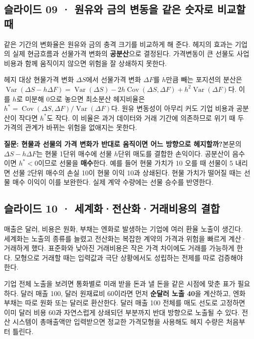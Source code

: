 \documentclass[11pt,a4paper]{article}
\begin{document}
\subsection{슬라이드 09 · 원유와 금의 변동을 같은 숫자로 비교할 때}
같은 기간의 변화율은 원유와 금의 충격 크기를 비교하게 해 준다. 헤지의 효과는 기업의 실제 현금흐름과 선물가격 변화의 \textbf{공분산}으로 결정된다. 가격변동이 큰 선물도 사업 비용과 함께 움직이지 않으면 위험을 잘 상쇄하지 못한다.\par

헤지 대상 현물가격 변화 $\Delta S$에서 선물가격 변화 $\Delta F$를 $h$만큼 빼는 포지션의 분산은 $\operatorname{Var}(\Delta S-h\Delta F)=\operatorname{Var}(\Delta S)-2h\operatorname{Cov}(\Delta S,\Delta F)+h^2\operatorname{Var}(\Delta F)$다. 이를 $h$로 미분해 0으로 놓으면 최소분산 헤지비율은 $h^*=\operatorname{Cov}(\Delta S,\Delta F)/\operatorname{Var}(\Delta F)$다. 원유 변동성이 아무리 커도 기업 비용과 공분산이 작다면 $h^*$도 작다. 이 비율은 과거 데이터와 거래 기간에 의존하므로 위기 때 두 가격의 관계가 바뀌는 위험을 없애지는 못한다.\par

\par\medskip\noindent\textbf{질문: 현물과 선물의 가격 변화가 반대로 움직이면 어느 방향으로 헤지할까?}\quad 본문의 $\Delta S-h\Delta F$는 현물 1단위 매수에 선물 $h$단위 매도를 결합한 손익이다. 공분산이 음수이면 $h^*<0$이므로 선물을 \textbf{매수}한다. 예를 들어 현물 가치가 10 오를 때 선물이 5 내리면 선물 2단위 매수의 손실 10이 현물 이익 10과 상쇄된다. 현물 가치가 떨어질 때는 선물 매수 이익이 이를 보완한다. 실제 계약 수량에는 선물 승수를 반영한다.\par

\subsection{슬라이드 10 · 세계화·전산화·거래비용의 결합}
매출은 달러, 비용은 원화, 부채는 엔화로 발생하는 기업에 여러 환율 노출이 생긴다. 세계화는 노출의 종류를 늘렸고 전산화는 복잡한 계약의 가격과 위험을 빠르게 계산·거래하게 했다. 표준화와 낮아진 거래비용은 작은 가격 차이에도 거래를 가능하게 한다. 모형으로 거래할 때는 입력값과 극단 상황에서도 성립하는 전제를 따로 검증해야 한다.\par

기업 전체 노출을 보려면 통화별로 미래 받을 돈과 낼 돈을 같은 시점에 맞춘 표가 필요하다. 달러 매출 100, 달러 원재료비 60이라면 먼저 \textbf{순달러 노출 40}을 계산하고, 엔화 부채는 따로 원화 또는 달러로 환산한다. 달러 매출 100 전체를 매도 선도로 고정하면 이미 달러 비용 60과 자연스럽게 상쇄되던 부분까지 반대 방향으로 노출될 수 있다. 전산 시스템이 총매출액만 입력받으면 정교한 가격모형을 사용해도 헤지 수량은 처음부터 틀린다.\par
\end{document}
